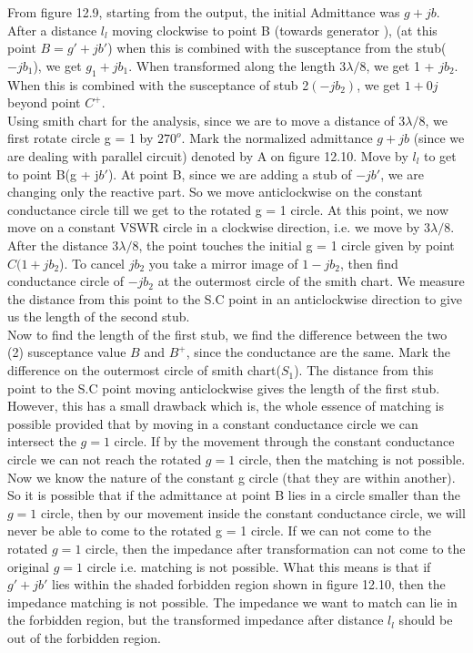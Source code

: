 From figure 12.9, starting from the output, the initial Admittance was $g + jb$. After a distance $l_l$ moving clockwise to point B (towards generator ), (at this point $B = g' + jb'$) when this is combined with the susceptance from the stub($-jb_1$), we get $g_1 +jb_1$. When transformed along the length $3\lambda/8$, we get 1 + $jb_2$. When this is combined with the susceptance of stub 2$(-jb_2)$, we get $1 + 0j$ beyond point $C^+$.\\

Using smith chart for the analysis, since we are to move a distance of $3\lambda/8$, we first rotate circle g = 1  by $270^o$. Mark the normalized admittance $g + jb$  (since we are dealing with parallel circuit) denoted by A on figure 12.10. Move by $l_l$ to get to point B(g + j$b'$). At point B, since we are adding a stub of $-jb'$, we are changing only the reactive part. So we move anticlockwise on the constant conductance circle till we get to the rotated g = 1 circle. At this point, we now move on a constant VSWR circle in a clockwise direction, i.e. we move by $ 3\lambda/8$. After the distance $ 3\lambda/8$, the point touches the initial g = 1 circle given by point $C (1+ jb_2$). To cancel $jb_2$ you take a mirror image of $1-jb_2$, then find conductance circle of $ -jb_2$ at the outermost circle of the smith chart. We measure the distance from this point to the S.C point in an anticlockwise direction to give us the length of the second stub.\\

Now to find the length of the first stub, we find the difference between the two (2) susceptance value $B$ and $B^+$, since the conductance are the same. Mark the difference on the outermost circle of smith chart($S_1$). The distance from this point to the S.C point moving anticlockwise gives the length of the first stub. \\

However, this has a small drawback which is, the whole essence of matching is possible provided that by moving in a constant conductance circle we can intersect the $g = 1$ circle. If by the movement through the constant conductance circle we can not reach the rotated $g = 1$ circle, then the matching is not possible. Now we know the nature of the constant g circle (that they are within another). So it is possible that if the admittance at point B lies in a circle smaller than the $g = 1$ circle, then by our movement inside the constant conductance circle, we will never be able to come to the rotated g = 1 circle. If we can not come to the rotated $g = 1$ circle, then the impedance after transformation can not come to the original $g =1$ circle i.e. matching is not possible. What this means is that if $g' + jb'$ lies within the shaded forbidden region shown in figure 12.10, then the impedance matching is not possible. The impedance we want to match can lie in the forbidden region, but the transformed impedance after distance $ l_l$ should be out of the forbidden region.\\

